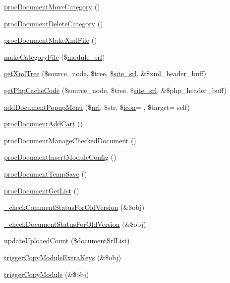 \begin{DoxyCompactItemize}
\item 
\hyperlink{classdocumentController_a6bb8b84c1f775b59f74ef8d68ba48f55}{proc\+Document\+Move\+Category} ()
\item 
\hyperlink{classdocumentController_a60d6012f96c71ee539d4152bc2c6f994}{proc\+Document\+Delete\+Category} ()
\item 
\hyperlink{classdocumentController_a749d60be23e4645a5656a82a4fae1962}{proc\+Document\+Make\+Xml\+File} ()
\item 
\hyperlink{classdocumentController_a75dc24adc286b03e6eeb23eb7f771d8f}{make\+Category\+File} (\$\hyperlink{ko_8install_8php_a370bb6450fab1da3e0ed9f484a38b761}{module\+\_\+srl})
\item 
\hyperlink{classdocumentController_ad18d5e7c2cfbef82020548e13e00df7d}{get\+Xml\+Tree} (\$source\+\_\+node, \$tree, \$\hyperlink{ko_8install_8php_a8b1406b4ad1048041558dce6bfe89004}{site\+\_\+srl}, \&\$xml\+\_\+header\+\_\+buff)
\item 
\hyperlink{classdocumentController_a0e0c1eb0506e936703b6b2b4ed958e5f}{get\+Php\+Cache\+Code} (\$source\+\_\+node, \$tree, \$\hyperlink{ko_8install_8php_a8b1406b4ad1048041558dce6bfe89004}{site\+\_\+srl}, \&\$php\+\_\+header\+\_\+buff)
\item 
\hyperlink{classdocumentController_a763e7cfbb01e26e7b0adaf0d25ff9373}{add\+Document\+Popup\+Menu} (\$\hyperlink{swfupload_8js_a440a52a9004fdab0700100a6ddb49f67}{url}, \$str, \$\hyperlink{config_8min_8js_a939508fb879a7e4dc00e07a67919400c}{icon}= \textquotesingle{}\textquotesingle{}, \$target= \textquotesingle{}self\textquotesingle{})
\item 
\hyperlink{classdocumentController_a9072167f6533f269be32a0a43e147dae}{proc\+Document\+Add\+Cart} ()
\item 
\hyperlink{classdocumentController_a96dee41cd75a387fee93375d33633aba}{proc\+Document\+Manage\+Checked\+Document} ()
\item 
\hyperlink{classdocumentController_aede408d35ea6622dfa1b39ec52f84e44}{proc\+Document\+Insert\+Module\+Config} ()
\item 
\hyperlink{classdocumentController_a65e4d6ef48c59e92bf82e8ced4b85d4d}{proc\+Document\+Temp\+Save} ()
\item 
\hyperlink{classdocumentController_a23cf92fe7c204813d12c5996360cd939}{proc\+Document\+Get\+List} ()
\item 
\hyperlink{classdocumentController_a3fad5f9653c0ca05bcb1a63a24c318cf}{\+\_\+check\+Comment\+Status\+For\+Old\+Version} (\&\$obj)
\item 
\hyperlink{classdocumentController_ad0d7bdcafe22b9f7ee8f5ae072f3f146}{\+\_\+check\+Document\+Status\+For\+Old\+Version} (\&\$obj)
\item 
\hyperlink{classdocumentController_a2e3e591a2262e0fffc195456248b89ff}{update\+Uploaed\+Count} (\$document\+Srl\+List)
\item 
\hyperlink{classdocumentController_a5e03be29c7b61f87658b604ba80daa88}{trigger\+Copy\+Module\+Extra\+Keys} (\&\$obj)
\item 
\hyperlink{classdocumentController_a612ee2c47ff03e76f6e86fa31ff098a7}{trigger\+Copy\+Module} (\&\$obj)
\end{DoxyCompactItemize}
